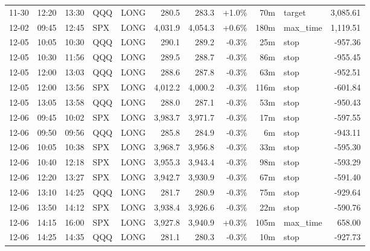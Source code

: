 \documentclass[11pt,a4paper,twoside]{article}
\begin{document}
\begin{center}
\begin{longtable}{>{\color{txtmain}}l l l l l r r r r >{\color{txtmain}}l r}
11-30 & 12:20 & 13:30 & QQQ & LONG & 280.5 & 283.3 & \textcolor{wingreen}{+1.0\%} & 70m & target & \textcolor{wingreen}{3,085.61} \\
12-02 & 09:45 & 12:45 & SPX & LONG & 4,031.9 & 4,054.3 & \textcolor{wingreen}{+0.6\%} & 180m & max\_time & \textcolor{wingreen}{1,119.51} \\
12-05 & 10:05 & 10:30 & QQQ & LONG & 290.1 & 289.2 & \textcolor{lossred}{-0.3\%} & 25m & stop & \textcolor{lossred}{-957.36} \\
12-05 & 10:30 & 11:56 & QQQ & LONG & 289.5 & 288.7 & \textcolor{lossred}{-0.3\%} & 86m & stop & \textcolor{lossred}{-955.45} \\
12-05 & 12:00 & 13:03 & QQQ & LONG & 288.6 & 287.8 & \textcolor{lossred}{-0.3\%} & 63m & stop & \textcolor{lossred}{-952.51} \\
12-05 & 12:00 & 13:56 & SPX & LONG & 4,012.2 & 4,000.2 & \textcolor{lossred}{-0.3\%} & 116m & stop & \textcolor{lossred}{-601.84} \\
12-05 & 13:05 & 13:58 & QQQ & LONG & 288.0 & 287.1 & \textcolor{lossred}{-0.3\%} & 53m & stop & \textcolor{lossred}{-950.43} \\
12-06 & 09:45 & 10:02 & SPX & LONG & 3,983.7 & 3,971.7 & \textcolor{lossred}{-0.3\%} & 17m & stop & \textcolor{lossred}{-597.55} \\
12-06 & 09:50 & 09:56 & QQQ & LONG & 285.8 & 284.9 & \textcolor{lossred}{-0.3\%} & 6m & stop & \textcolor{lossred}{-943.11} \\
12-06 & 10:05 & 10:38 & SPX & LONG & 3,968.7 & 3,956.8 & \textcolor{lossred}{-0.3\%} & 33m & stop & \textcolor{lossred}{-595.30} \\
12-06 & 10:40 & 12:18 & SPX & LONG & 3,955.3 & 3,943.4 & \textcolor{lossred}{-0.3\%} & 98m & stop & \textcolor{lossred}{-593.29} \\
12-06 & 12:20 & 13:27 & SPX & LONG & 3,942.7 & 3,930.9 & \textcolor{lossred}{-0.3\%} & 67m & stop & \textcolor{lossred}{-591.40} \\
12-06 & 13:10 & 14:25 & QQQ & LONG & 281.7 & 280.9 & \textcolor{lossred}{-0.3\%} & 75m & stop & \textcolor{lossred}{-929.64} \\
12-06 & 13:50 & 14:12 & SPX & LONG & 3,938.4 & 3,926.6 & \textcolor{lossred}{-0.3\%} & 22m & stop & \textcolor{lossred}{-590.76} \\
12-06 & 14:15 & 16:00 & SPX & LONG & 3,927.8 & 3,940.9 & \textcolor{wingreen}{+0.3\%} & 105m & max\_time & \textcolor{wingreen}{658.00} \\
12-06 & 14:25 & 14:35 & QQQ & LONG & 281.1 & 280.3 & \textcolor{lossred}{-0.3\%} & 10m & stop & \textcolor{lossred}{-927.73} \\

\end{longtable}
\end{center}
\end{document}
